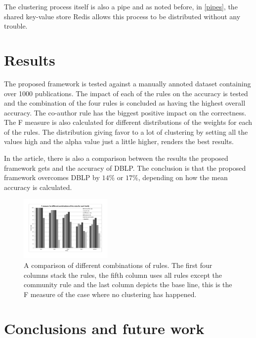 \documentclass[9pt, twocolumn]{phdsymp} %
\begin{document}
The clustering process itself is also a pipe and as noted before, in \autoref{pipes}, the shared key-value store Redis allows this process to be distributed without any trouble.

\section{Results}

The proposed framework is tested against a manually annoted dataset containing over 1000 publications. The impact of each of the rules on the accuracy is tested and the combination of the four rules is concluded as having the highest overall accuracy. The co-author rule has the biggest positive impact on the correctness. The F measure is also calculated for different distributions of the weights for each of the rules. The distribution giving favor to a lot of clustering by setting all the values high and the alpha value just a little higher, renders the best results. 

In the article, there is also a comparison between the results the proposed framework gets and the accuracy of DBLP. The conclusion is that the proposed framework overcomes DBLP by $14\%$ or $17\%$, depending on how the mean accuracy is calculated.


\begin{figure}[htpb!]
\centering
\includegraphics[width= 0.4\textwidth]{fig/test-rules.pdf}
\caption{A comparison of different combinations of rules. The first four columns stack the rules, the fifth column uses all rules except the community rule and the last column depicts the base line, this is the F measure of the case where no clustering has happened.}
\label{fig:testperformance}
\end{figure}



\section{Conclusions and future work}



\end{document}
